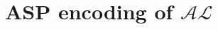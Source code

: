 \documentclass[../interim.tex]{subfiles}
\begin{document}
\section{ASP encoding of $\mathcal{AL}$} \label{appendix-al}
\end{document}
